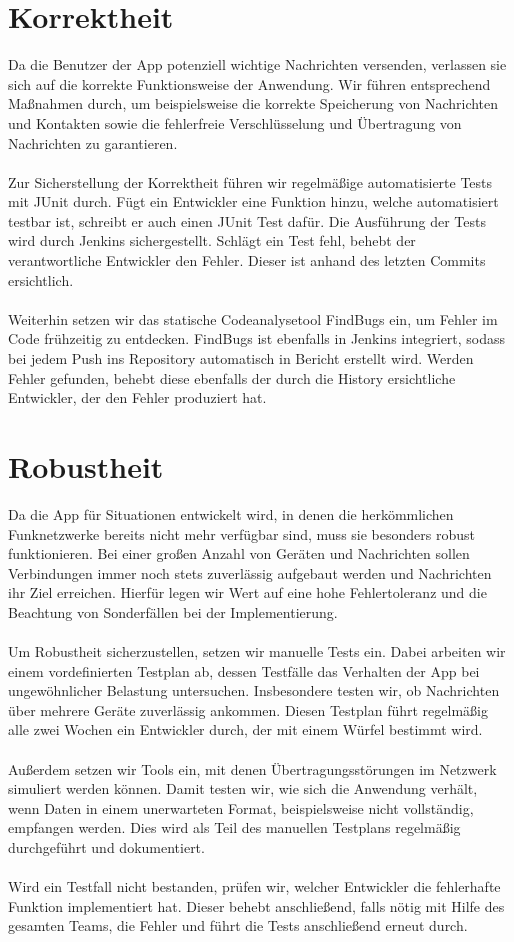 \documentclass[accentcolor=tud0b,12pt,paper=a4]{tudreport}
\begin{document}
    \section{Korrektheit}
      Da die Benutzer der App potenziell wichtige Nachrichten versenden, verlassen sie sich auf die korrekte Funktionsweise der Anwendung. Wir führen entsprechend Maßnahmen durch, um beispielsweise die korrekte Speicherung von Nachrichten und Kontakten sowie die fehlerfreie Verschlüsselung und Übertragung von Nachrichten zu garantieren.\\\\
      Zur Sicherstellung der Korrektheit führen wir regelmäßige automatisierte Tests mit JUnit durch. Fügt ein Entwickler eine Funktion hinzu, welche automatisiert testbar ist, schreibt er auch einen JUnit Test dafür. Die Ausführung der Tests wird durch Jenkins sichergestellt. Schlägt ein Test fehl, behebt der verantwortliche Entwickler den Fehler. Dieser ist anhand des letzten Commits ersichtlich.\\\\
      Weiterhin setzen wir das statische Codeanalysetool FindBugs ein, um Fehler im Code frühzeitig zu entdecken. FindBugs ist ebenfalls in Jenkins integriert, sodass bei jedem Push ins Repository automatisch in Bericht erstellt wird. Werden Fehler gefunden, behebt diese ebenfalls der durch die History ersichtliche Entwickler, der den Fehler produziert hat.

    \section{Robustheit}
      Da die App für Situationen entwickelt wird, in denen die herkömmlichen Funknetzwerke bereits nicht mehr verfügbar sind, muss sie besonders robust funktionieren. Bei einer großen Anzahl von Geräten und Nachrichten sollen Verbindungen immer noch stets zuverlässig aufgebaut werden und Nachrichten ihr Ziel erreichen. Hierfür legen wir Wert auf eine hohe Fehlertoleranz und die Beachtung von Sonderfällen bei der Implementierung.\\\\
      Um Robustheit sicherzustellen, setzen wir manuelle Tests ein. Dabei arbeiten wir einem vordefinierten Testplan ab, dessen Testfälle das Verhalten der App bei ungewöhnlicher Belastung untersuchen. Insbesondere testen wir, ob Nachrichten über mehrere Geräte zuverlässig ankommen. Diesen Testplan führt regelmäßig alle zwei Wochen ein Entwickler durch, der mit einem Würfel bestimmt wird.\\\\
      Außerdem setzen wir Tools ein, mit denen Übertragungsstörungen im Netzwerk simuliert werden können. Damit testen wir, wie sich die Anwendung verhält, wenn Daten in einem unerwarteten Format, beispielsweise nicht vollständig, empfangen werden. Dies wird als Teil des manuellen Testplans regelmäßig durchgeführt und dokumentiert.\\\\
      Wird ein Testfall nicht bestanden, prüfen wir, welcher Entwickler die fehlerhafte Funktion implementiert hat. Dieser behebt anschließend, falls nötig mit Hilfe des gesamten Teams, die Fehler und führt die Tests anschließend erneut durch.
\end{document}
